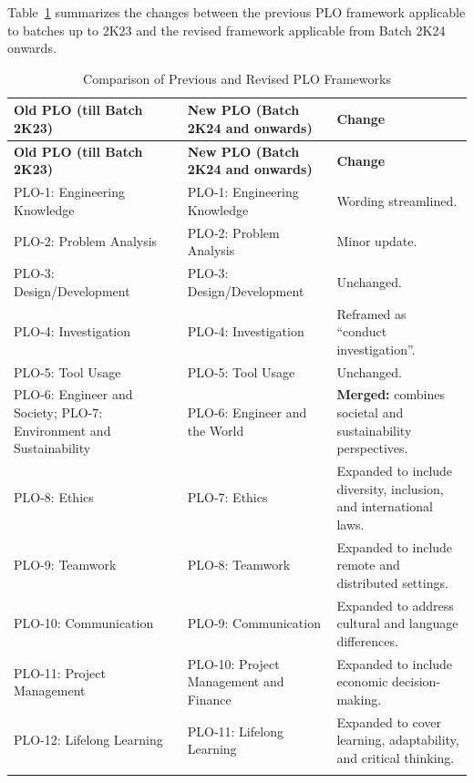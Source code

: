 Table~\ref{tab:plo-revision} summarizes the changes between the previous
PLO framework applicable to batches up to 2K23 and the revised framework
applicable from Batch 2K24 onwards.

\begin{longtable}{|p{}|p{}|p{}|}
\hline
\textbf{Old PLO (till Batch 2K23)} &
\textbf{New PLO (Batch 2K24 and onwards)} &
\textbf{Change} \\
\hline
\endfirsthead

\hline
\textbf{Old PLO (till Batch 2K23)} &
\textbf{New PLO (Batch 2K24 and onwards)} &
\textbf{Change} \\
\hline
\endhead

PLO-1: Engineering Knowledge &
PLO-1: Engineering Knowledge &
Wording streamlined. \\
\hline

PLO-2: Problem Analysis &
PLO-2: Problem Analysis &
Minor update. \\
\hline

PLO-3: Design/Development &
PLO-3: Design/Development &
Unchanged. \\
\hline

PLO-4: Investigation &
PLO-4: Investigation &
Reframed as ``conduct investigation''. \\
\hline

PLO-5: Tool Usage &
PLO-5: Tool Usage &
Unchanged. \\
\hline

PLO-6: Engineer and Society; PLO-7: Environment and Sustainability &
PLO-6: Engineer and the World &
\textbf{Merged:} combines societal and sustainability perspectives. \\
\hline

PLO-8: Ethics &
PLO-7: Ethics &
Expanded to include diversity, inclusion, and international laws. \\
\hline

PLO-9: Teamwork &
PLO-8: Teamwork &
Expanded to include remote and distributed settings. \\
\hline

PLO-10: Communication &
PLO-9: Communication &
Expanded to address cultural and language differences. \\
\hline

PLO-11: Project Management &
PLO-10: Project Management and Finance &
Expanded to include economic decision-making. \\
\hline

PLO-12: Lifelong Learning &
PLO-11: Lifelong Learning &
Expanded to cover learning, adaptability, and critical thinking. \\
\hline
\caption{Comparison of Previous and Revised PLO Frameworks}
\label{tab:plo-revision}\\
\end{longtable}

